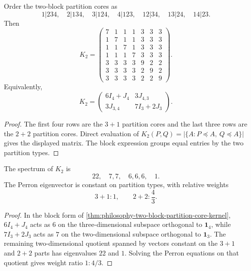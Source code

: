 \begin{theorem}
\label{thm:philosophy-two-block-partition-core-kernel}
Order the two-block partition cores as
$$
  1|234,\quad 2|134,\quad 3|124,\quad 4|123,
  \quad 12|34,\quad 13|24,\quad 14|23.
$$
Then
$$
K_{2}
=
\begin{pmatrix}
7&1&1&1&3&3&3\\
1&7&1&1&3&3&3\\
1&1&7&1&3&3&3\\
1&1&1&7&3&3&3\\
3&3&3&3&9&2&2\\
3&3&3&3&2&9&2\\
3&3&3&3&2&2&9
\end{pmatrix}.
$$
Equivalently,
$$
  K_{2}
  =
  \begin{pmatrix}
    6I_{4}+J_{4} & 3J_{4,3}\\
    3J_{3,4} & 7I_{3}+2J_{3}
  \end{pmatrix}.
$$
\end{theorem}
\begin{proof}
The first four rows are the $3+1$ partition cores and the last three rows
are the $2+2$ partition cores. Direct evaluation of
$K_{2}(P,Q)=|\{A:P\preceq A,\ Q\preceq A\}|$ gives the displayed matrix.
The block expression groups equal entries by the two partition types.
\end{proof}

\begin{theorem}
\label{thm:philosophy-two-block-partition-core-kernel-spectrum}
The spectrum of $K_{2}$ is
$$
  22,\quad 7,7,\quad 6,6,6,\quad 1.
$$
The Perron eigenvector is constant on partition types, with relative
weights
$$
  3+1:1,
  \qquad
  2+2:\frac{4}{3}.
$$
\end{theorem}
\begin{proof}
In the block form of
\autoref{thm:philosophy-two-block-partition-core-kernel},
$6I_{4}+J_{4}$ acts as $6$ on the three-dimensional subspace orthogonal
to $\mathbf{1}_{4}$, while $7I_{3}+2J_{3}$ acts as $7$ on the
two-dimensional subspace orthogonal to $\mathbf{1}_{3}$. The remaining
two-dimensional quotient spanned by vectors constant on the $3+1$ and
$2+2$ parts has eigenvalues $22$ and $1$. Solving the Perron equations on
that quotient gives weight ratio $1:4/3$.
\end{proof}

